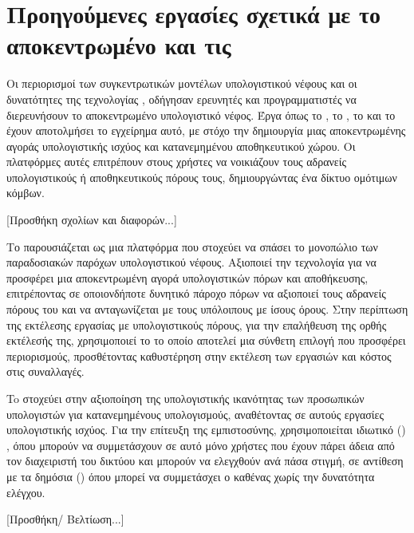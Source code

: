 \section{Προηγούμενες εργασίες σχετικά με το αποκεντρωμένο  και τις }
Οι περιορισμοί των συγκεντρωτικών μοντέλων υπολογιστικού νέφους και οι 
δυνατότητες της τεχνολογίας , οδήγησαν ερευνητές και 
προγραμματιστές να διερευνήσουν το αποκεντρωμένο υπολογιστικό νέφος. 
Έργα όπως το , το , το  και το  
έχουν αποτολμήσει το εγχείρημα αυτό, με στόχο την δημιουργία μιας 
αποκεντρωμένης αγοράς υπολογιστικής ισχύος και κατανεμημένου αποθηκευτικού 
χώρου.
Οι πλατφόρμες αυτές επιτρέπουν στους χρήστες να νοικιάζουν τους αδρανείς 
υπολογιστικούς ή αποθηκευτικούς πόρους τους, δημιουργώντας ένα δίκτυο 
ομότιμων κόμβων.

[Προσθήκη σχολίων και διαφορών...]

Το  παρουσιάζεται ως μια πλατφόρμα που στοχεύει να σπάσει 
το μονοπώλιο των παραδοσιακών παρόχων υπολογιστικού νέφους. Αξιοποιεί 
την τεχνολογία  για να προσφέρει μια αποκεντρωμένη αγορά 
υπολογιστικών πόρων και αποθήκευσης, επιτρέποντας σε οποιονδήποτε δυνητικό 
πάροχο πόρων να αξιοποιεί τους αδρανείς πόρους του και να ανταγωνίζεται με 
τους υπόλοιπους με ίσους όρους. Στην περίπτωση της εκτέλεσης εργασίας με 
υπολογιστικούς πόρους, για την επαλήθευση της ορθής εκτέλεσής της, 
χρησιμοποιεί το  το οποίο αποτελεί μια σύνθετη επιλογή που προσφέρει περιορισμούς, προσθέτοντας καθυστέρηση στην εκτέλεση των εργασιών και κόστος στις συναλλαγές.

To  στοχεύει στην αξιοποίηση της υπολογιστικής ικανότητας 
των προσωπικών υπολογιστών για κατανεμημένους υπολογισμούς, αναθέτοντας 
σε αυτούς εργασίες υπολογιστικής ισχύος. Για την επίτευξη της εμπιστοσύνης, 
χρησιμοποιείται ιδιωτικό () , όπου μπορούν να 
συμμετάσχουν σε αυτό μόνο χρήστες που έχουν πάρει άδεια από τον διαχειριστή του δικτύου και μπορούν να ελεγχθούν ανά πάσα στιγμή, σε αντίθεση με τα δημόσια ()  όπου μπορεί να συμμετάσχει ο καθένας χωρίς την δυνατότητα 
ελέγχου.

[Προσθήκη/ Βελτίωση...]